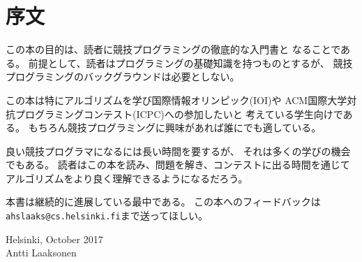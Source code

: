 \begin{comment}
\chapter*{Preface}
\markboth{\MakeUppercase{Preface}}{}
\addcontentsline{toc}{chapter}{Preface}
\end{comment}
\chapter*{序文}

\begin{comment}
The purpose of this book is to give you
a thorough introduction to competitive programming.
It is assumed that you already
know the basics of programming, but no previous
background in competitive programming is needed.
\end{comment}

この本の目的は、読者に競技プログラミングの徹底的な入門書と
なることである。
前提として、読者はプログラミングの基礎知識を持つものとするが、
競技プログラミングのバックグラウンドは必要としない。

\begin{comment}
The book is especially intended for
students who want to learn algorithms and
possibly participate in
the International Olympiad in Informatics (IOI) or
in the International Collegiate Programming Contest (ICPC).
Of course, the book is also suitable for 
anybody else interested in competitive programming.
\end{comment}

この本は特にアルゴリズムを学び国際情報オリンピック(IOI)や
ACM国際大学対抗プログラミングコンテスト(ICPC)への参加したいと
考えている学生向けである。
もちろん競技プログラミングに興味があれば誰にでも適している。

\begin{comment}
It takes a long time to become a good competitive
programmer, but it is also an opportunity to learn a lot.
You can be sure that you will get
a good general understanding of algorithms
if you spend time reading the book,
solving problems and taking part in contests.
\end{comment}

良い競技プログラマになるには長い時間を要するが、
それは多くの学びの機会でもある。
読者はこの本を読み、問題を解き、コンテストに出る時間を通じて
アルゴリズムをより良く理解できるようになるだろう。

\begin{comment}
The book is under continuous development.
You can always send feedback on the book to
\texttt{ahslaaks@cs.helsinki.fi}.
\end{comment}

本書は継続的に進展している最中である。
この本へのフィードバックは\texttt{ahslaaks@cs.helsinki.fi}まで送ってほしい。


\begin{flushright}
Helsinki, October 2017 \\
Antti Laaksonen
\end{flushright}
